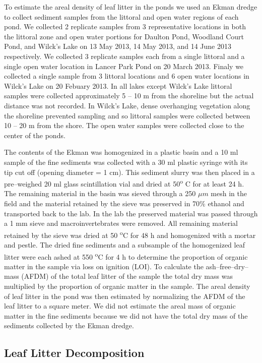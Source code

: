 \documentclass{article}
\begin{document}
To estimate the areal density of leaf litter in the ponds we used an Ekman dredge to collect sediment samples from the littoral and open water regions of each pond. We collected 2 replicate samples from 3 representative locations in both the littoral zone and open water portions for Daulton Pond, Woodland Court Pond, and Wilck's Lake on 13 May 2013, 14 May 2013, and 14 June 2013 respectively. We collected 3 replicate samples each from a single littoral and a single open water location in Lancer Park Pond on 20 March 2013.  Finaly we collected a single sample from 3 littoral locations and 6 open water locations in Wilck's Lake on 20 Febuary 2013. In all lakes except Wilck's Lake littoral samples were collected approximately 5 -- 10 m from the shoreline but the actual distance was not recorded. In Wilck's Lake, dense overhanging vegetation along the shoreline prevented sampling and so littoral samples were collected between 10 -- 20 m from the shore. The open water samples were collected close to the center of the ponds.

The contents of the Ekman was homogenized in a plastic basin and a 10 ml sample of the fine sediments was collected with a 30 ml plastic syringe with its tip cut off (opening diameter = 1 cm). This sediment slurry was then placed in a pre--weighed 20 ml glass scintillation vial and dried at 50\textsuperscript{o} C for at least 24 h. The remaining material in the basin was sieved through a 250 $\mu m$ mesh in the field and the material retained by the sieve was preserved in 70\% ethanol and transported back to the lab.  In the lab the preserved material was passed through a 1 mm sieve and macroinvertebrates were removed.  All remaining material retained by the sieve was dried at 50 \textsuperscript{o}C for 48 h and homogenized with a mortar and pestle. The dried fine sediments and a subsample of the homogenized leaf litter were each ashed at 550 \textsuperscript{o}C for 4 h to determine the proportion of organic matter in the sample via loss on ignition (LOI).  To calculate the ash--free--dry--mass (AFDM) of the total leaf litter of the sample the total dry mass was multiplied by the proportion of organic matter in the sample. The areal density of leaf litter in the pond was then estimated by normalizing the AFDM of the leaf litter to a square meter. We did not estimate the areal mass of organic matter in the fine sediments because we did not have the total dry mass of the sediments collected by the Ekman dredge.
  
  

\subsection{Leaf Litter Decomposition}
\end{document}
